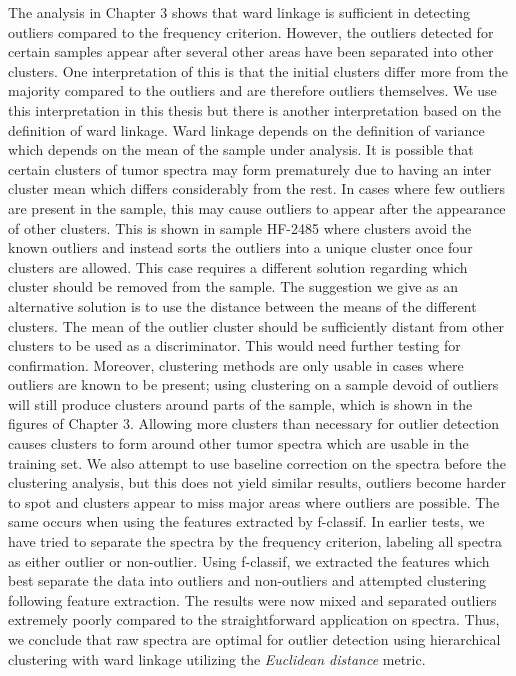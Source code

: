 The analysis in Chapter 3 shows that ward linkage is sufficient in detecting outliers compared to the frequency criterion. However, the outliers detected for certain samples appear after several other areas have been separated into other clusters. One interpretation of this is that the initial clusters differ more from the majority compared to the outliers and are therefore outliers themselves. We use this interpretation in this thesis but there is another interpretation based on the definition of ward linkage. Ward linkage depends on the definition of variance which depends on the mean of the sample under analysis. It is possible that certain clusters of tumor spectra may form prematurely due to having an inter cluster mean which differs considerably from the rest. In cases where few outliers are present in the sample, this may cause outliers to appear after the appearance of other clusters. This is shown in sample HF-2485 where clusters avoid the known outliers and instead sorts the outliers into a unique cluster once four clusters are allowed. This case requires a different solution regarding which cluster should be removed from the sample. The suggestion we give as an alternative solution is to use the distance between the means of the different clusters. The mean of the outlier cluster should be sufficiently distant from other clusters to be used as a discriminator. This would need further testing for confirmation. Moreover, clustering methods are only usable in cases where outliers are known to be present; using clustering on a sample devoid of outliers will still produce clusters around parts of the sample, which is shown in the figures of Chapter 3. Allowing more clusters than necessary for outlier detection causes clusters to form around other tumor spectra which are usable in the training set. We also attempt to use baseline correction on the spectra before the clustering analysis, but this does not yield similar results, outliers become harder to spot and clusters appear to miss major areas where outliers are possible. The same occurs when using the features extracted by f-classif. In earlier tests, we have tried to separate the spectra by the frequency criterion, labeling all spectra as either outlier or non-outlier. Using f-classif, we extracted the features which best separate the data into outliers and non-outliers and attempted clustering following feature extraction. The results were now mixed and separated outliers extremely poorly compared to the straightforward application on spectra. Thus, we conclude that raw spectra are optimal for outlier detection using hierarchical clustering with ward linkage utilizing the \textit{Euclidean distance} metric.

